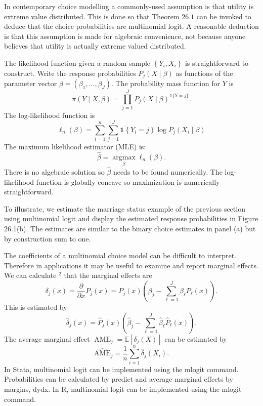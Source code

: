 \documentclass[10pt]{article}
\begin{document}
In contemporary choice modelling a commonly-used assumption is that utility is extreme value distributed. This is done so that Theorem $26.1$ can be invoked to deduce that the choice probabilities are multinomial logit. A reasonable deduction is that this assumption is made for algebraic convenience, not because anyone believes that utility is actually extreme valued distributed.

The likelihood function given a random sample $\left\{Y_{i}, X_{i}\right\}$ is straightforward to construct. Write the response probabilities $P_{j}(X \mid \beta)$ as functions of the parameter vector $\beta=\left(\beta_{1}, \ldots, \beta_{J}\right)$. The probability mass function for $Y$ is
$$
\pi(Y \mid X, \beta)=\prod_{j=1}^{J} P_{j}(X \mid \beta)^{\mathbb{1}\{Y=j\}} .
$$
The log-likelihood function is
$$
\ell_{n}(\beta)=\sum_{i=1}^{n} \sum_{j=1}^{J} \mathbb{1}\left\{Y_{i}=j\right\} \log P_{j}\left(X_{i} \mid \beta\right)
$$
The maximum likelihood estimator (MLE) is:
$$
\widehat{\beta}=\underset{\beta}{\operatorname{argmax}} \ell_{n}(\beta) .
$$
There is no algebraic solution so $\widehat{\beta}$ needs to be found numerically. The log-likelihood function is globally concave so maximization is numerically straightforward.

To illustrate, we estimate the marriage status example of the previous section using multinomial logit and display the estimated response probabilities in Figure 26.1(b). The estimates are similar to the binary choice estimates in panel (a) but by construction sum to one.

The coefficients of a multinomial choice model can be difficult to interpret. Therefore in applications it may be useful to examine and report marginal effects. We can calculate ${ }^{2}$ that the marginal effects are
$$
\delta_{j}(x)=\frac{\partial}{\partial x} P_{j}(x)=P_{j}(x)\left(\beta_{j}-\sum_{\ell=1}^{J} \beta_{\ell} P_{\ell}(x)\right) .
$$
This is estimated by
$$
\widehat{\delta}_{j}(x)=\widehat{P}_{j}(x)\left(\widehat{\beta}_{j}-\sum_{\ell=1}^{J} \widehat{\beta}_{\ell} \widehat{P}_{\ell}(x)\right) .
$$
The average marginal effect $\operatorname{AME}_{j}=\mathbb{E}\left[\delta_{j}(X)\right]$ can be estimated by
$$
\widehat{\mathrm{AME}}_{j}=\frac{1}{n} \sum_{i=1}^{n} \widehat{\delta}_{j}\left(X_{i}\right) .
$$
In Stata, multinomial logit can be implemented using the mlogit command. Probabilities can be calculated by predict and average marginal effects by margins, dydx. In R, multinomial logit can be implemented using the mlogit command.
\end{document}
